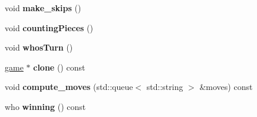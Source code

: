 \begin{DoxyCompactItemize}
\item 
void {\bfseries make\+\_\+skips} ()\hypertarget{classmain__savitch__14_1_1Othello_a3177234195a490eef52343d957e64b5d}{}\label{classmain__savitch__14_1_1Othello_a3177234195a490eef52343d957e64b5d}

\item 
void {\bfseries counting\+Pieces} ()\hypertarget{classmain__savitch__14_1_1Othello_a19f49edfbe82b84922877e00bc854ed8}{}\label{classmain__savitch__14_1_1Othello_a19f49edfbe82b84922877e00bc854ed8}

\item 
void {\bfseries whos\+Turn} ()\hypertarget{classmain__savitch__14_1_1Othello_a21440dbb4511812a76c578a5f546710b}{}\label{classmain__savitch__14_1_1Othello_a21440dbb4511812a76c578a5f546710b}

\item 
\hyperlink{classmain__savitch__14_1_1game}{game} $\ast$ {\bfseries clone} () const \hypertarget{classmain__savitch__14_1_1Othello_ab5a505f8a6ffd860376bf074c57e8a5f}{}\label{classmain__savitch__14_1_1Othello_ab5a505f8a6ffd860376bf074c57e8a5f}

\item 
void {\bfseries compute\+\_\+moves} (std\+::queue$<$ std\+::string $>$ \&moves) const \hypertarget{classmain__savitch__14_1_1Othello_aae15562565348c574b8e4c0b7782d19f}{}\label{classmain__savitch__14_1_1Othello_aae15562565348c574b8e4c0b7782d19f}

\item 
who {\bfseries winning} () const \hypertarget{classmain__savitch__14_1_1Othello_a8934d1b63f73c03dae9629dbe03955d7}{}\label{classmain__savitch__14_1_1Othello_a8934d1b63f73c03dae9629dbe03955d7}

\end{DoxyCompactItemize}
